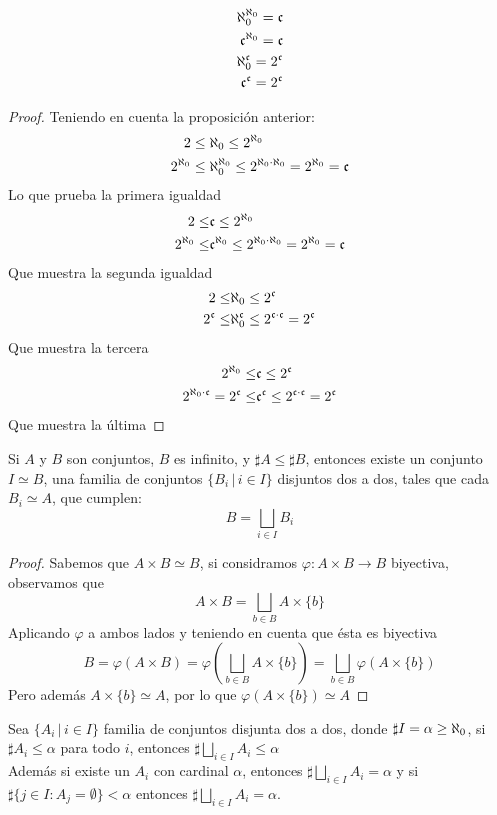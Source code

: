 \documentclass[12pt,a4paper]{book}
\begin{document}
\begin{prop}
\begin{align}
\a0^{\a0} = \c \\
\c^{\a0} = \c \\
\a0^{\c} = 2^{\c} \\
\c^{\c} = 2^{\c}
\end{align}
\begin{proof}Teniendo en cuenta la proposición anterior:
\begin{align*}
2 \leq &\; \aleph_0\leq 2^{\aleph_0} \\
2^{\a0} \leq &\;\a0^{\a0}\leq 2^{\a0 \cdot \a0} = 2^{\a0} = \c
\end{align*}
Lo que prueba la primera igualdad
\begin{align*}
2 \leq &\c \leq 2^{\a0} \\
2^{\a0} \leq &\c^{\a0} \leq 2^{\a0 \cdot \a0} = 2^{\a0} = \c
\end{align*}
Que muestra la segunda igualdad
\begin{align*}
2 \leq &\a0 \leq 2^{\c} \\
2^{\c} \leq &\a0^{\c} \leq 2^{\c \cdot \c} = 2^{\c}
\end{align*}
Que muestra la tercera
\begin{align*}
2^{\a0} \leq &\c \leq 2^{\c}\\
2^{\a0 \cdot \c} = 2^{\c} \leq &\c^{\c} \leq 2^{\c \cdot \c} = 2^{\c}
\end{align*}
Que muestra la última
\end{proof}
\end{prop}
\begin{prop}
Si $A$ y $B$ son conjuntos, $B$ es infinito, y $\sharp A \leq \sharp B$, entonces existe un conjunto $I \simeq B$, una familia de conjuntos $\{ B_i \,\vert\, i \in I \}$ disjuntos dos a dos, tales que cada $B_i \simeq A$, que cumplen:
$$ B = \bigsqcup_{i \in I} B_i$$
\begin{proof}
Sabemos que $A \times B \simeq B$, si considramos $\varphi : A \times B \rightarrow B$ biyectiva, observamos que 
$$ A \times B = \bigsqcup_{b \in B} A \times \{b\}$$
Aplicando $\varphi$ a ambos lados y teniendo en cuenta que ésta es biyectiva
$$B = \varphi(A \times B) = \varphi \left(\bigsqcup_{b \in B} A \times \{b\}\right) = \bigsqcup_{b \in B} \varphi(A \times \{b\})$$
Pero además $A \times \{b\} \simeq A$, por lo que $\varphi (A \times \{b\}) \simeq A$
\end{proof}
\end{prop}
\begin{cor}
Sea $\{A_i \,\vert\, i \in I\}$ familia de conjuntos disjunta dos a dos, donde $\sharp I = \alpha \geq \a0$, si $\sharp A_i \leq \alpha$ para todo $i$, entonces $\sharp \bigsqcup_{i \in I} A_i \leq \alpha$\\
Además si existe un $A_i$ con cardinal $\alpha$, entonces $\sharp \bigsqcup_{i \in I} A_i = \alpha$ y si $\sharp \{ j \in I : A_j = \emptyset\} < \alpha$ entonces $\sharp \bigsqcup_{i \in I} A_i = \alpha$.
\end{cor}
\end{document}
